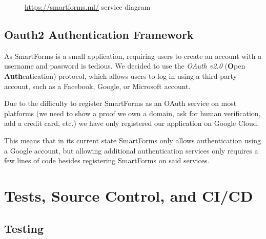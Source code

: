 \documentclass[11pt, a4paper]{report}
\begin{document}
\begin{figure}[!h]
	\centering
	\caption{\url{https://smartforms.ml/} service diagram}
	\label{smartformsml-diagram}
\end{figure}


\section{Oauth2 Authentication Framework}

As SmartForms is a small application, requiring users to create an account with a username and password is tedious. We decided to use the \textit{OAuth v2.0} \cite{oauth2} (\textbf{O}pen \textbf{Auth}entication) protocol, which allows users to log in using a third-party account, such as a Facebook, Google, or Microsoft account.

Due to the difficulty to register SmartForms as an OAuth service on most platforms (we need to show a proof we own a domain, ask for human verification, add a credit card, etc.) we have only registered our application on Google Cloud.

This means that in its current state SmartForms only allows authentication using a Google account, but allowing additional authentication services only requires a few lines of code besides registering SmartForms on said services.


\chapter{Tests, Source Control, and CI/CD}
\label{chapter-tests-source-control}

\section{Testing}
\end{document}
